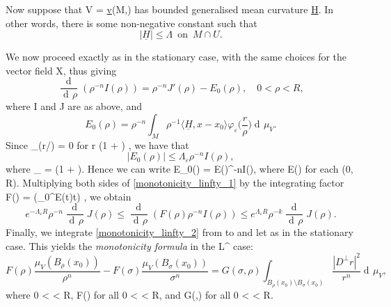 \documentclass[a4paper, 11pt]{article}
\theoremstyle{plain}
\theoremstyle{definition}
\theoremstyle{remark}
\DeclareMathOperator{\diff}{d \!}
\numberwithin{equation}{subsection}
\def\({}
\def\){}
\begin{document}
Now suppose that \(V = \underline{v}(M,\theta)\) has bounded generalised mean curvature \(\underline{H}\). In other words, there is some non-negative constant \(\Lambda\) such that
\begin{equation}
|\underline{H}| \leqslant \Lambda \enspace \text{on} \enspace M \cap U.
\end{equation}

We now proceed exactly as in the stationary case, with the same choices for the vector field \(X\), thus giving
\begin{equation}
\label{monotonicity_linfty_1}
\frac{\!\diff}{\diff\rho}(\rho^{-n}I(\rho)) = \rho^{-n}J'(\rho) - E_{0}(\rho), \quad 0 < \rho < R,
\end{equation}
where \(I\) and \(J\) are as above, and
\begin{equation}
E_{0}(\rho) = \rho^{-n}\int_{M}\rho^{-1}\langle \underline{H}, x - x_{0} \rangle \varphi_{\varepsilon}\biggl(\frac{r}{\rho}\biggr)\diff\mu_V.
\end{equation}
Since \(\varphi_{\varepsilon}(r/\rho) = 0\) for \(r \geqslant (1 + \varepsilon) \rho\), we have that
\begin{equation}
\vert E_0(\rho) \vert \leqslant \Lambda_{\varepsilon}\rho^{-n}I(\rho),
\end{equation}
where \(\Lambda_{\varepsilon} = (1 + \varepsilon)\Lambda\). Hence we can write \(E_0(\rho) = E(\rho)\rho^{-n}I(\rho)\), where \(E(\rho) \in [-\Lambda_{\varepsilon}, \Lambda_{\varepsilon}]\) for each \(\rho \in (0, R)\). Multiplying both sides of \eqref{monotonicity_linfty_1} by the integrating factor \(F(\rho) = \exp(\int_{0}^{\rho}E(t)\diff t) \), we obtain
\begin{equation}
\label{monotonicity_linfty_2}
e^{-\Lambda_{\varepsilon}R}\rho^{-n}\frac{\!\diff}{\diff\rho}J(\rho) \leqslant \frac{\!\diff}{\diff\rho}(F(\rho)\rho^{-n}I(\rho)) \leqslant e^{\Lambda_{\varepsilon}R}\rho^{-k}\frac{\!\diff}{\diff\rho}J(\rho).
\end{equation}
Finally, we integrate \eqref{monotonicity_linfty_2} from \(\sigma\) to \(\rho\) and let \(\varepsilon {}\) as in the stationary case. This yields the \emph{monotonicity formula} in the \(L^{\infty}\) case:
\begin{equation}
F(\rho)\frac{\mu_{V}(B_{\rho}(x_0))}{\rho^{n}} - F(\sigma)\frac{\mu_{V}(B_{\sigma}(x_0))}{\sigma^{n}} = G(\sigma,\rho)\int_{B_{\rho}(x_0) \setminus B_{\sigma}(x_0)}\frac{|D^{\perp}r|^2}{r^n} \diff \mu_V,
\end{equation}
where \(0 < \sigma \leqslant \rho < R\), \(F(\rho) \in {}\) for all \(0 < \rho < R\), and \(G(\sigma,\rho) \in {}\) for all \(0 < \sigma \leqslant \rho < R\).
\end{document}
